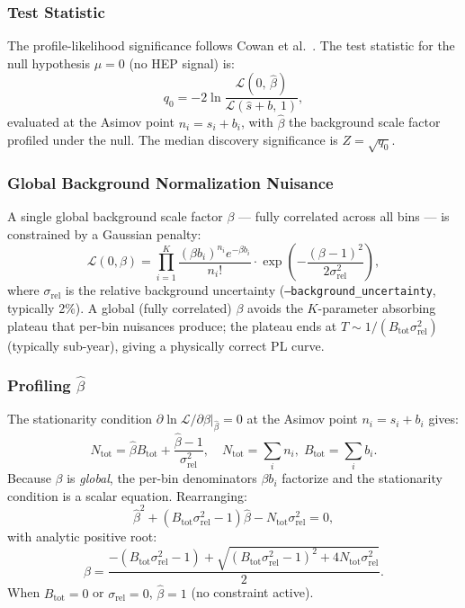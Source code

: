\documentclass[12pt,a4paper]{article}
\newcommand{\si}{s_{i}}                  %
\newcommand{\bi}{b_{i}}                  %
\newcommand{\nni}{n_{i}}                 %
\newcommand{\bhat}{\hat{\beta}}
\newcommand{\srel}{\sigma_{\mathrm{rel}}}
\newcommand{\srelsq}{\sigma_{\mathrm{rel}}^{2}}
\newcommand{\Btot}{B_{\mathrm{tot}}}
\newcommand{\Ntot}{N_{\mathrm{tot}}}
\begin{document}
\subsubsection{Test Statistic}
\label{sec:pl_model}

The profile-likelihood significance follows Cowan et al.\ \cite{Cowan2010}.
The test statistic for the null hypothesis $\mu=0$ (no HEP signal) is:
\begin{equation}
  q_0 = -2\ln\!\frac{\mathcal{L}(0,\,\bhat)}{\mathcal{L}(\hat{s}+b,\,1)},
  \label{eq:q0}
\end{equation}
evaluated at the Asimov point $\nni = \si + \bi$, with $\bhat$ the
background scale factor profiled under the null.
The median discovery significance is $Z = \sqrt{q_0}$.

\subsubsection{Global Background Normalization Nuisance}
\label{sec:pl_nuisance}

A single global background scale factor $\beta$ — fully correlated across
all bins — is constrained by a Gaussian penalty:
\begin{equation}
  \mathcal{L}(0,\beta)
  = \prod_{i=1}^{K}
      \frac{(\beta \bi)^{\nni} e^{-\beta \bi}}{\nni!}
    \cdot\exp\!\left(-\frac{(\beta-1)^2}{2\srelsq}\right),
  \label{eq:likelihood}
\end{equation}
where $\srel$ is the relative background uncertainty
(\texttt{--background\_uncertainty}, typically 2\%).
A global (fully correlated) $\beta$ avoids the $K$-parameter absorbing
plateau that per-bin nuisances produce; the plateau ends at
$T \sim 1/(B_{\mathrm{tot}}\srelsq)$ (typically sub-year),
giving a physically correct PL curve.

\subsubsection{Profiling \texorpdfstring{$\bhat$}{beta-hat}}
\label{sec:betahat}

The stationarity condition
$\partial\ln\mathcal{L}/\partial\beta\big|_{\bhat}=0$
at the Asimov point $\nni=\si+\bi$ gives:
\begin{equation}
  \Ntot = \bhat\Btot + \frac{\bhat-1}{\srelsq},
  \quad
  \Ntot = \sum_i \nni,\;\Btot = \sum_i \bi.
  \label{eq:stationarity}
\end{equation}
Because $\beta$ is \emph{global}, the per-bin denominators $\beta\bi$
factorize and the stationarity condition is a scalar equation.
Rearranging:
\begin{equation}
  \bhat^2 + \left(\Btot\srelsq-1\right)\bhat - \Ntot\srelsq = 0,
  \label{eq:beta_quadratic}
\end{equation}
with analytic positive root:
\begin{equation}
  \bhat = \frac{-(\Btot\srelsq-1)
    + \sqrt{(\Btot\srelsq-1)^2 + 4\Ntot\srelsq}}{2}.
  \label{eq:beta_solution}
\end{equation}
When $\Btot=0$ or $\srel=0$, $\bhat=1$ (no constraint active).
\end{document}
